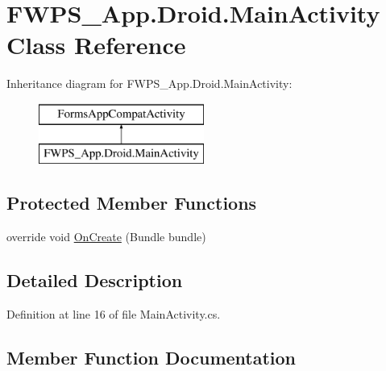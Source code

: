 \hypertarget{class_f_w_p_s___app_1_1_droid_1_1_main_activity}{}\section{F\+W\+P\+S\+\_\+\+App.\+Droid.\+Main\+Activity Class Reference}
\label{class_f_w_p_s___app_1_1_droid_1_1_main_activity}
Inheritance diagram for F\+W\+P\+S\+\_\+\+App.\+Droid.\+Main\+Activity\+:\begin{figure}[H]
\begin{center}
\leavevmode
\includegraphics[height=2.000000cm]{class_f_w_p_s___app_1_1_droid_1_1_main_activity}
\end{center}
\end{figure}
\subsection*{Protected Member Functions}
\begin{DoxyCompactItemize}
\item 
override void \mbox{\hyperlink{class_f_w_p_s___app_1_1_droid_1_1_main_activity_a7a1eb29cd97f5c36cffeb65f85cae186}{On\+Create}} (Bundle bundle)
\end{DoxyCompactItemize}


\subsection{Detailed Description}


Definition at line 16 of file Main\+Activity.\+cs.



\subsection{Member Function Documentation}
\mbox{\label{class_f_w_p_s___app_1_1_droid_1_1_main_activity_a7a1eb29cd97f5c36cffeb65f85cae186}} 
